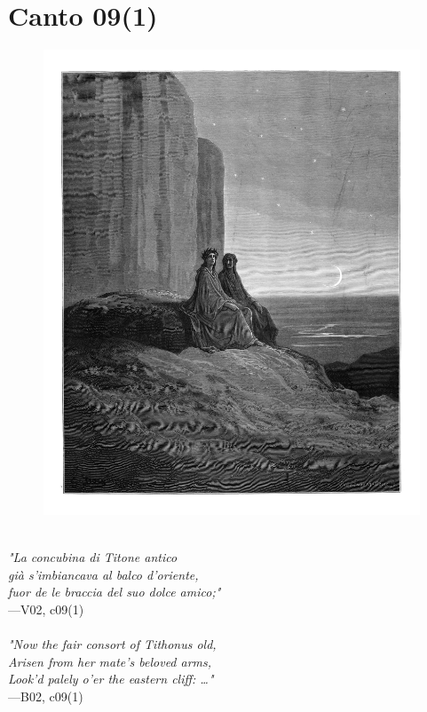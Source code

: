 \documentclass[../Dore_vision.tex]{subfiles}
\begin{document}
\newpage

\section{Canto 09(1)}

\begin{figure}[ht]
\centering
\includegraphics[height=\figsize]{illustrations/book_2/V02, c09(1).jpg}
\end{figure}

\begin{center}
\begin{minipage}{0.8\linewidth}
\textit{\\
"La concubina di Titone antico\\già s’imbiancava al balco d’oriente,\\fuor de le braccia del suo dolce amico;"} \\
—V02, c09(1) \\~\\
\textit{"Now the fair consort of Tithonus old,\\Arisen from her mate's beloved arms,\\Look'd palely o'er the eastern cliff: …"} \\
—B02, c09(1)
\end{minipage}
\end{center}
\end{document}
